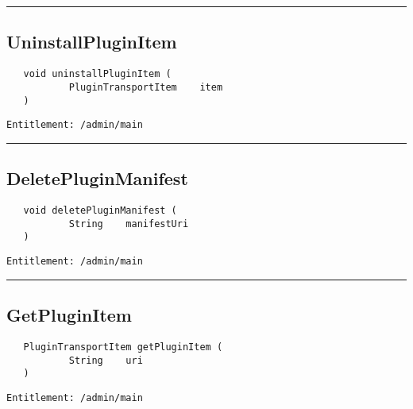\rule{12cm}{2pt}
\subsection{UninstallPluginItem}
\label{Api:UninstallPluginItem}
\begin{verbatim}
   void uninstallPluginItem (
           PluginTransportItem    item
   )
\end{verbatim}
\begin{Verbatim}[fontsize=\small, formatcom=\color{Maroon}]
  Entitlement: /admin/main
\end{Verbatim}



\rule{12cm}{2pt}
\subsection{DeletePluginManifest}
\label{Api:DeletePluginManifest}
\begin{verbatim}
   void deletePluginManifest (
           String    manifestUri
   )
\end{verbatim}
\begin{Verbatim}[fontsize=\small, formatcom=\color{Maroon}]
  Entitlement: /admin/main
\end{Verbatim}



\rule{12cm}{2pt}
\subsection{GetPluginItem}
\label{Api:GetPluginItem}
\begin{verbatim}
   PluginTransportItem getPluginItem (
           String    uri
   )
\end{verbatim}
\begin{Verbatim}[fontsize=\small, formatcom=\color{Maroon}]
  Entitlement: /admin/main
\end{Verbatim}



